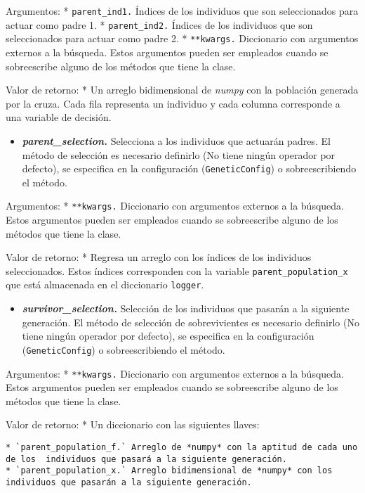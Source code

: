 \documentclass[11pt]{article}
\providecommand{\tightlist}{%
      \setlength{\itemsep}{0pt}\setlength{\parskip}{0pt}}
\begin{document}
Argumentos: * \texttt{parent\_ind1.} Índices de los individuos que son
seleccionados para actuar como padre 1. * \texttt{parent\_ind2.} Índices
de los individuos que son seleccionados para actuar como padre 2. *
\texttt{**kwargs.} Diccionario con argumentos externos a la búsqueda.
Estos argumentos pueden ser empleados cuando se sobreescribe alguno de
los métodos que tiene la clase.

Valor de retorno: * Un arreglo bidimensional de \emph{numpy} con la
población generada por la cruza. Cada fila representa un individuo y
cada columna corresponde a una variable de decisión.

    \begin{itemize}
\tightlist
\item
  \emph{\textbf{parent\_selection.}} Selecciona a los individuos que
  actuarán padres. El método de selección es necesario definirlo (No
  tiene ningún operador por defecto), se especifica en la configuración
  (\texttt{GeneticConfig}) o sobreescribiendo el método.
\end{itemize}

Argumentos: * \texttt{**kwargs.} Diccionario con argumentos externos a
la búsqueda. Estos argumentos pueden ser empleados cuando se
sobreescribe alguno de los métodos que tiene la clase.

Valor de retorno: * Regresa un arreglo con los índices de los individuos
seleccionados. Estos índices corresponden con la variable
\texttt{parent\_population\_x} que está almacenada en el diccionario
\texttt{logger}.

    \begin{itemize}
\tightlist
\item
  \emph{\textbf{survivor\_selection.}} Selección de los individuos que
  pasarán a la siguiente generación. El método de selección de
  sobrevivientes es necesario definirlo (No tiene ningún operador por
  defecto), se especifica en la configuración (\texttt{GeneticConfig}) o
  sobreescribiendo el método.
\end{itemize}

Argumentos: * \texttt{**kwargs.} Diccionario con argumentos externos a
la búsqueda. Estos argumentos pueden ser empleados cuando se
sobreescribe alguno de los métodos que tiene la clase.

Valor de retorno: * Un diccionario con las siguientes llaves:

\begin{verbatim}
* `parent_population_f.` Arreglo de *numpy* con la aptitud de cada uno de los  individuos que pasará a la siguiente generación.
* `parent_population_x.` Arreglo bidimensional de *numpy* con los individuos que pasarán a la siguiente generación.
\end{verbatim}
\end{document}
